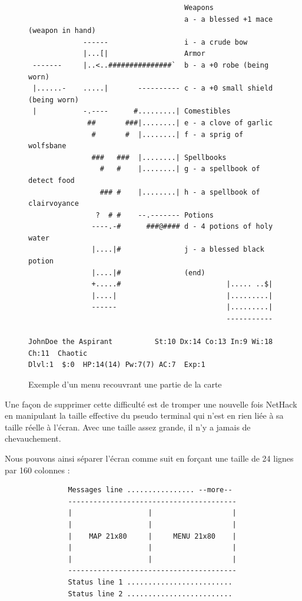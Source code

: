 \documentclass[a4paper,12pt]{article}
\begin{document}
\begin{figure}[H]
	\caption{Exemple d'un menu recouvrant une partie de la carte}
	\begin{verbatim}
                                     Weapons
                                     a - a blessed +1 mace (weapon in hand)
             ------                  i - a crude bow
             |...[|                  Armor
 -------     |..<..###############`  b - a +0 robe (being worn)
 |......-    .....|       ---------- c - a +0 small shield (being worn)
 |           -.----      #.........| Comestibles
              ##       ###|........| e - a clove of garlic
               #       #  |........| f - a sprig of wolfsbane
               ###   ###  |........| Spellbooks
                 #   #    |........| g - a spellbook of detect food
                 ### #    |........| h - a spellbook of clairvoyance
                ?  # #    --.------- Potions
               ----.-#      ###@#### d - 4 potions of holy water
               |....|#               j - a blessed black potion
               |....|#               (end) 
               +.....#                         |..... ..$|
               |....|                          |.........|
               ------                          |.........|
                                               -----------

JohnDoe the Aspirant          St:10 Dx:14 Co:13 In:9 Wi:18 Ch:11  Chaotic
Dlvl:1  $:0  HP:14(14) Pw:7(7) AC:7  Exp:1
	\end{verbatim}
\end{figure}

Une façon de supprimer cette difficulté est de tromper une nouvelle fois NetHack en manipulant la taille effective du pseudo terminal qui n'est en rien liée à sa taille réelle à l'écran. Avec une taille assez grande, il n'y a jamais de chevauchement.

Nous pouvons ainsi séparer l'écran comme suit en forçant une taille de 24 lignes par 160 colonnes :

\begin{verbatim}
               Messages line ................ --more--
               ----------------------------------------
               |                  |                   |
               |                  |                   |
               |    MAP 21x80     |     MENU 21x80    |
               |                  |                   |
               |                  |                   |
               ----------------------------------------
               Status line 1 .........................
               Status line 2 .........................
\end{verbatim}
\end{document}
